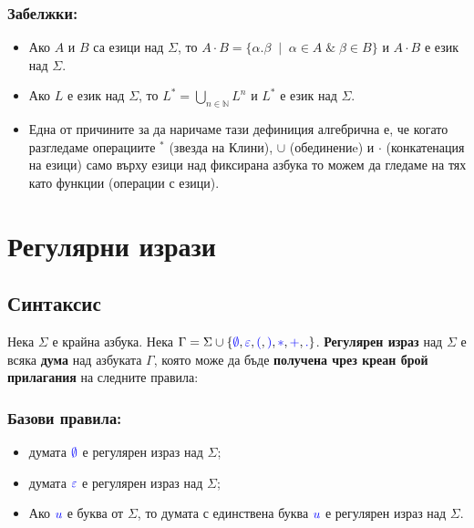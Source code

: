 \documentclass[12pt]{article}
\begin{document}
\subsubsection{Забелжки:}
\begin{itemize}
    \item Ако \(A\) и \(B\) са езици над \(\Sigma\), то \(A \cdot B = \{\alpha.\beta \;\mid\; \alpha \in A \;\&\; \beta \in B\}\) и \(A \cdot B\) е език над \(\Sigma\).
    \item Ако \(L\) е език над \(\Sigma\), то \(L^* = \displaystyle\bigcup_{n \in \mathbb{N}} L^n\) и \(L^*\) е език над \(\Sigma\).
    \item Една от причините за да наричаме тази дефиниция алгебрична е, че когато разгледаме операциите \({}^*\) (звезда на Клини), \(\cup\) (обединениe) и \(\cdot\) (конкатенация на езици) само върху езици над фиксирана азбука то можем да гледаме на тях като функции (операции с езици).
\end{itemize}

\section{Регулярни изрази}

\subsection{Синтаксис}
Нека \(\Sigma\) е крайна азбука. Нека \(\Gamma = \Sigma \cup \{\textcolor{blue}{\emptyset}, \textcolor{blue}{\varepsilon}, \textcolor{blue}{(}, \textcolor{blue}{)}, \textcolor{blue}{*}, \textcolor{blue}{+}, \textcolor{blue}{\Large{.}}\}\).
\textbf{Регулярен израз} над \(\Sigma\) е всяка \textbf{дума} над азбуката \(\Gamma\),
която може да бъде \textbf{получена чрез креан брой прилагания} на следните правила:

\subsubsection{Базови правила:}
\begin{itemize}
    \item думата \(\textcolor{blue}{\emptyset}\) е регулярен израз над \(\Sigma\);
    \item  думата \(\textcolor{blue}{\varepsilon}\) е регулярен израз над \(\Sigma\);
    \item Ако \(\textcolor{blue}{u}\) е буква от \(\Sigma\), то думата с единствена буква \(\textcolor{blue}{u}\) е регулярен израз над \(\Sigma\).
\end{itemize}
\end{document}
